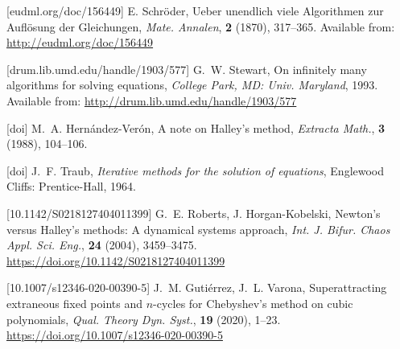 \IfFileExists{aims.cls}{\documentclass{aims}}{\documentclass[11pt]{article}}
\numberwithin{equation}{section}
\theoremstyle{thmstyleone}%
\theoremstyle{thmstyletwo}%
\theoremstyle{thmstylethree}%
\providecommand{\doilink}[1]{\href{#1}{#1}}
\begin{document}
\begin{thebibliography}{999}
%
%
%
%
%
[eudml.org/doc/156449]
E. Schr\"oder,  {Ueber unendlich viele Algorithmen zur Aufl\"osung der Gleichungen},
      {\it Mate. Annalen},
      \textbf{2} (1870), 317--365. Available from:  \url{http://eudml.org/doc/156449}

[drum.lib.umd.edu/handle/1903/577]
G.~W. Stewart,  {On infinitely many algorithms for solving equations},
      {\it  College Park, MD: Univ. Maryland},
     1993.  Available from:  \url{http://drum.lib.umd.edu/handle/1903/577}%


 [doi]
M.~A. Hern\'andez-Ver\'on, {A note on Halley's method},
      {\it Extracta Math.},
      \textbf{3} (1988), 104--106.

 [doi]
J.~F. Traub, {\em Iterative methods for the solution of equations}, 
Englewood Cliffs: Prentice-Hall, 1964.

[10.1142/S0218127404011399]
G.~E. Roberts, J. Horgan-Kobelski,  {Newton's versus Halley's methods: A dynamical systems approach},
      {\it Int. J. Bifur. Chaos Appl. Sci. Eng.},
      \textbf{24} (2004), 3459--3475. \doilink{https://doi.org/10.1142/S0218127404011399}


[10.1007/s12346-020-00390-5]
J.~M. Guti\'errez, J.~L. Varona,  {Superattracting extraneous fixed points and $n$-cycles for Chebyshev's method on cubic polynomials},
      {\it Qual. Theory  Dyn. Syst.},
      \textbf{19} (2020), 1--23. \doilink{https://doi.org/10.1007/s12346-020-00390-5}



\end{thebibliography}
\end{document}
